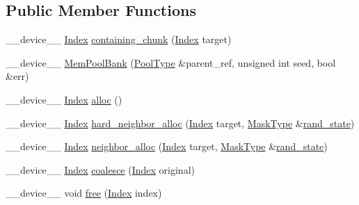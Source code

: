 \subsection*{Public Member Functions}
\begin{DoxyCompactItemize}
\item 
\-\_\-\-\_\-device\-\_\-\-\_\- \hyperlink{structutil_1_1MemPoolBank_a1acaedbb0b2b5d18faa451597e54d61d}{Index} \hyperlink{structutil_1_1MemPoolBank_a4dadb9a01cf7c7600bd193438823d610}{containing\-\_\-chunk} (\hyperlink{structutil_1_1MemPoolBank_a1acaedbb0b2b5d18faa451597e54d61d}{Index} target)
\item 
\-\_\-\-\_\-device\-\_\-\-\_\- \hyperlink{structutil_1_1MemPoolBank_a69f38c4c7e6ec55da24bbb5e37c74752}{Mem\-Pool\-Bank} (\hyperlink{structutil_1_1MemPoolBank_aedc2fc3adbebd6cba13f64058ac208f8}{Pool\-Type} \&parent\-\_\-ref, unsigned int seed, bool \&err)
\item 
\-\_\-\-\_\-device\-\_\-\-\_\- \hyperlink{structutil_1_1MemPoolBank_a1acaedbb0b2b5d18faa451597e54d61d}{Index} \hyperlink{structutil_1_1MemPoolBank_a1469ea5f091a9bd938d1c8fd357cdabe}{alloc} ()
\item 
\-\_\-\-\_\-device\-\_\-\-\_\- \hyperlink{structutil_1_1MemPoolBank_a1acaedbb0b2b5d18faa451597e54d61d}{Index} \hyperlink{structutil_1_1MemPoolBank_ab34d2d8859b6519341dbccf4d6ad6ba4}{hard\-\_\-neighbor\-\_\-alloc} (\hyperlink{structutil_1_1MemPoolBank_a1acaedbb0b2b5d18faa451597e54d61d}{Index} target, \hyperlink{structutil_1_1MemPoolBank_aef12a55d338543b98354e53c5137e7ed}{Mask\-Type} \&\hyperlink{structutil_1_1MemPoolBank_a43ec026289969363cba9a80f59d5f9b7}{rand\-\_\-state})
\item 
\-\_\-\-\_\-device\-\_\-\-\_\- \hyperlink{structutil_1_1MemPoolBank_a1acaedbb0b2b5d18faa451597e54d61d}{Index} \hyperlink{structutil_1_1MemPoolBank_a9f2f47881e85697be8f078e12368877d}{neighbor\-\_\-alloc} (\hyperlink{structutil_1_1MemPoolBank_a1acaedbb0b2b5d18faa451597e54d61d}{Index} target, \hyperlink{structutil_1_1MemPoolBank_aef12a55d338543b98354e53c5137e7ed}{Mask\-Type} \&\hyperlink{structutil_1_1MemPoolBank_a43ec026289969363cba9a80f59d5f9b7}{rand\-\_\-state})
\item 
\-\_\-\-\_\-device\-\_\-\-\_\- \hyperlink{structutil_1_1MemPoolBank_a1acaedbb0b2b5d18faa451597e54d61d}{Index} \hyperlink{structutil_1_1MemPoolBank_a29140e4c4beacd6e5233c8871d87eeb6}{coalesce} (\hyperlink{structutil_1_1MemPoolBank_a1acaedbb0b2b5d18faa451597e54d61d}{Index} original)
\item 
\-\_\-\-\_\-device\-\_\-\-\_\- void \hyperlink{structutil_1_1MemPoolBank_ad386a2f377e5cdba662a026b36063f38}{free} (\hyperlink{structutil_1_1MemPoolBank_a1acaedbb0b2b5d18faa451597e54d61d}{Index} index)
\end{DoxyCompactItemize}
